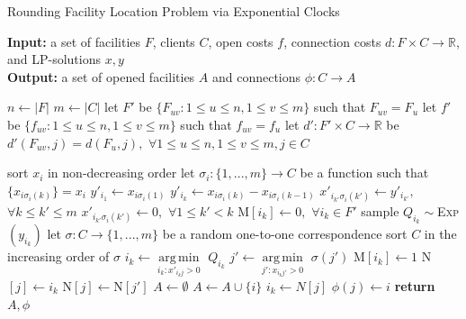 \documentclass[a4paper]{article}
\DeclareMathOperator*{\argmin}{arg\,min}
\begin{document}
\begin{algorithm}
\caption{Rounding Facility Location Problem via Exponential Clocks}
\hspace*{\algorithmicindent} \textbf{Input:} a set of facilities $F$, clients $C$, open costs $f$, connection costs $d:F\times C\rightarrow \mathbb{R}$, and LP-solutions $x, y$\\ 
\hspace*{\algorithmicindent} \textbf{Output:} a set of opened facilities $A$ and connections $\phi:C\rightarrow A$
\begin{algorithmic}[1]
\State $n\gets |F|$
\State $m\gets |C|$
\State let $F'$ be $\{F_{uv}:1\le u\le n, 1\le v\le m\}$ such that $F_{uv}=F_{u}$
\State let $f'$ be $\{f_{uv}:1\le u\le n, 1\le v\le m\}$ such that $f_{uv}=f_{u}$
\State let $d':F'\times C\rightarrow \mathbb{R}$ be $d'(F_{uv},j)=d(F_{u},j),$  $\forall 1\le u\le n, 1\le v\le m, j\in C$

\State sort $x_{i}$ in non-decreasing order
\State let $\sigma_{i}:\{1,...,m\}\rightarrow C$ be a function such that $\{x_{i\sigma_{i}(k)}\}=x_{i}$
\State $y'_{i_{1}}\gets x_{i\sigma_{i}(1)}$
\State $y'_{i_{k}}\gets x_{i\sigma_{i}(k)} - x_{i\sigma_{i}(k-1)}$
\EndFor
{}
\State $x'_{i_{k'}\sigma_{i}(k')}\gets  y'_{i_{k'}},$  $\forall k\le k'\le m$
\State $x'_{i_{k'}\sigma_{i}(k')}\gets 0,$  $\forall 1\le k'< k$
\EndFor
\EndFor
\State M$[i_{k}]\gets 0,$ \hspace{0.01cm} $\forall i_{k}\in F'$
\State sample $Q_{i_{k}}\sim$\textsc{Exp}$(y_{i_{k}})$
\EndFor
\State let $\sigma:C\rightarrow \{1,...,m\}$ be a random one-to-one correspondence
\State sort $C$ in the increasing order of $\sigma$
\State $i_{k}\gets \argmin\limits_{i_{k}:x'_{i_{k}j}>0}$ $Q_{i_{k}}$
\State $j'\gets \argmin\limits_{j':x_{i_{k}j'}>0}$ $\sigma (j')$
\State M$[i_{k}]\gets 1$
\State N$[j]\gets i_{k}$
\Else
\State N$[j]\gets $N$[j']$
\EndIf
\EndFor
\State $A\gets \emptyset$
\State $A\gets A\cup \{i\}$
\EndIf
\EndFor
{}
\State $i_{k}\gets N[j]$
\State $\phi (j)\gets i$
\EndFor
\State \textbf{return} $A, \phi$
\end{algorithmic}
\end{algorithm}
\end{document}
